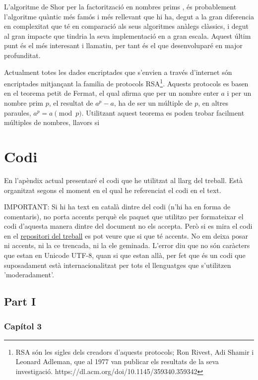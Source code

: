 L'algoritme de Shor per la factorització en nombres prims \cite{Shor_97}, és probablement l'algoritme quàntic més famós i més rellevant que hi ha, degut a la gran diferencia en complexitat que té en comparació als seus algoritmes anàlegs clàssics, i degut al gran impacte que tindria la seva implementació en a gran escala. Aquest últim punt és el més interesant i llamatiu, per tant és el que desenvoluparé en major profunditat. 

Actualment totes les dades encriptades que s'envien a través d'internet són encriptades mitjançant la familia de protocols RSA\footnote{RSA són les sigles dels creadors d'aquests protocols; Ron Rivest, Adi Shamir i Leonard Adleman, que al 1977 van publicar els resultats de la seva investigació.  https://dl.acm.org/doi/10.1145/359340.359342}. Aquests protocols es basen en el teorema petit de Fermat, el qual afirma que per un nombre enter $a$ i per un nombre prim $p$, el resultat de $a^p - a$, ha de ser un múltiple de $p$, en altres paraules, $a^p = a \pmod p$. Utilitzant aquest teorema es poden trobar facilment múltiples de nombres, llavors si 



\chapter{Codi}
En l'apèndix actual presentaré el codi que he utilitzat al llarg del treball. Està organitzat segons el moment en el qual he referenciat el codi en el text. 

IMPORTANT: Si hi ha text en català dintre del codi (n'hi ha en forma de comentaris), no porta accents perquè els paquet que utilitzo per formateixar el codi d'aquesta manera dintre del document no els accepta. Però si es mira el codi en el \href{https://github.com/tomiock/qGAN}{repositori del treball} es pot veure que si que té accents. No em deixa posar ni accents, ni la ce trencada, ni la ele geminada. L'error diu que no són caràcters que estan en Unicode UTF-8, quan si que estan allà, per fet que és un codi que suposadament està internacionalitzat per tots el llenguatges que s'utilitzen 'moderadament'. 

\section{Part I}
\subsection{Capítol 3}

